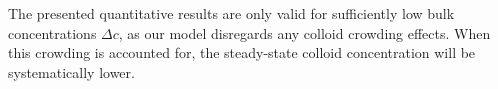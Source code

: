\documentclass[12pt, a4paper]{article}
\newcommand\todo[1]{\textcolor{red}{#1}}
\begin{document}





The presented quantitative results are only valid for sufficiently low bulk concentrations $\Delta c$, as our model disregards any colloid crowding effects.
When this crowding is accounted for, the steady-state colloid concentration will be systematically lower.


\end{document}
